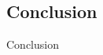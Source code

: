 \documentclass{beamer}
\begin{document}
\subsection{Conclusion}
\begin{frame}{Conclusion}


\end{frame}
\end{document}
